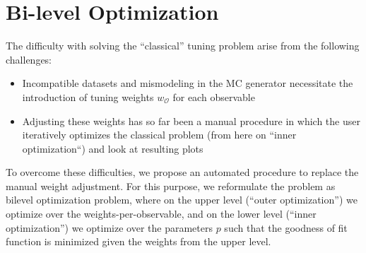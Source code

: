 
\section{Bi-level Optimization}
\label{sec-oopt}

The difficulty with solving the ``classical'' tuning problem arise from the following challenges: 
    \begin{itemize}
        \item Incompatible datasets and mismodeling in the MC generator necessitate the introduction of tuning weights $w_\mathcal{O}$ for each observable
        \item Adjusting these weights has so far been a manual procedure in which the user iteratively optimizes  the classical problem (from here on ``inner optimization``) and look at resulting plots
      \end{itemize} 
       
To overcome these difficulties, we propose an automated procedure to replace the manual weight adjustment. For this purpose, we reformulate the problem as bilevel optimization problem, where on the upper level (``outer optimization'') we optimize over the weights-per-observable, and on the lower level (``inner optimization'') we optimize over the parameters $p$ such that the goodness of fit function is minimized given the weights from the upper level.

